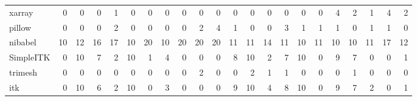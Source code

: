 \begin{tabular}{lrrrrrrrrrrrrrrrrrrrrr}
xarray & 0 & 0 & 0 & 1 & 0 & 0 & 0 & 0 & 0 & 0 & 0 & 0 & 0 & 0 & 0 & 0 & 4 & 2 & 1 & 4 & 2 \\
pillow & 0 & 0 & 0 & 2 & 0 & 0 & 0 & 0 & 2 & 4 & 1 & 0 & 0 & 3 & 1 & 1 & 1 & 0 & 1 & 1 & 0 \\
nibabel & 10 & 12 & 16 & 17 & 10 & 20 & 10 & 20 & 20 & 20 & 11 & 11 & 14 & 11 & 10 & 11 & 10 & 10 & 11 & 17 & 12 \\
SimpleITK & 0 & 10 & 7 & 2 & 10 & 1 & 4 & 0 & 0 & 0 & 8 & 10 & 2 & 7 & 10 & 0 & 9 & 7 & 0 & 0 & 1 \\
trimesh & 0 & 0 & 0 & 0 & 0 & 0 & 0 & 0 & 2 & 0 & 0 & 2 & 1 & 1 & 0 & 0 & 0 & 1 & 0 & 0 & 0 \\
itk & 0 & 10 & 6 & 2 & 10 & 0 & 3 & 0 & 0 & 0 & 9 & 10 & 4 & 8 & 10 & 0 & 9 & 7 & 2 & 0 & 1 \\
\bottomrule
\end{tabular}
